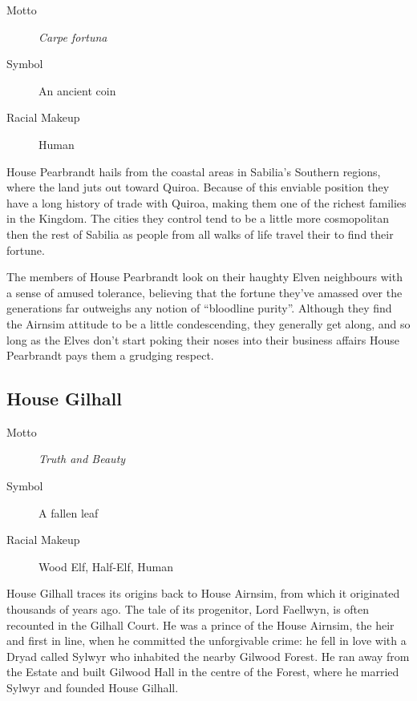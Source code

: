 \documentclass[10pt,twoside,openright,a4paper,twocolumn]{book}
\begin{document}
\begin{description}
\item[Motto] \textit{Carpe fortuna}

\item[Symbol] An ancient coin

\item[Racial Makeup] Human
\end{description}

\noindent
House Pearbrandt hails from the coastal areas in Sabilia's Southern regions,
where the land juts out toward Quiroa.  Because of this enviable position they
have a long history of trade with Quiroa, making them one of the richest
families in the Kingdom.  The cities they control tend to be a little more
cosmopolitan then the rest of Sabilia as people from all walks of life travel
their to find their fortune.

The members of House Pearbrandt look on their haughty Elven neighbours with a
sense of amused tolerance, believing that the fortune they've amassed over the
generations far outweighs any notion of ``bloodline purity''.  Although they
find the Airnsim attitude to be a little condescending, they generally get
along, and so long as the Elves don't start poking their noses into their
business affairs House Pearbrandt pays them a grudging respect.

\subsection*{House Gilhall}

\begin{description}
\item[Motto] \textit{Truth and Beauty}

\item[Symbol] A fallen leaf

\item[Racial Makeup] Wood Elf, Half-Elf, Human
\end{description}

\noindent
House Gilhall traces its origins back to House Airnsim, from which it
originated thousands of years ago.  The tale of its progenitor, Lord Faellwyn,
is often recounted in the Gilhall Court.  He was a prince of the House Airnsim,
the heir and first in line, when he committed the unforgivable crime: he fell
in love with a Dryad called Sylwyr who inhabited the nearby Gilwood Forest.  He
ran away from the Estate and built Gilwood Hall in the centre of the Forest,
where he married Sylwyr and founded House Gilhall.
\end{document}
